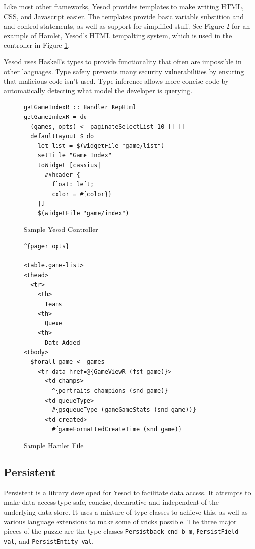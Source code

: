 \documentclass{chi2009}
\newcommand{\code}[1]{\texttt{#1}}
\begin{document}
Like most other frameworks, Yesod provides templates to make writing HTML, CSS, and Javascript easier. The templates provide basic variable substition and and control statements, as well as support for simplified stuff. See Figure \ref{hamlet} for an example of Hamlet, Yesod's HTML tempalting system, which is used in the controller in Figure \ref{controller}.

Yesod uses Haskell's types to provide functionality that often are impossible in other languages. Type safety prevents many security vulnerabilities by ensuring that malicious code isn't used. Type inference allows more concise code by automatically detecting what model the developer is querying.


\begin{figure}[]
\begin{verbatim}
getGameIndexR :: Handler RepHtml
getGameIndexR = do
  (games, opts) <- paginateSelectList 10 [] []
  defaultLayout $ do
    let list = $(widgetFile "game/list")
    setTitle "Game Index"
    toWidget [cassius|
      ##header {
        float: left;
        color = #{color}}
    |] 
    $(widgetFile "game/index")
\end{verbatim}
    \caption{Sample Yesod Controller}
    \label{controller}
\end{figure}

\begin{figure}[]
\begin{verbatim}
^{pager opts}

<table.game-list>
<thead>
  <tr>
    <th>
      Teams
    <th>
      Queue
    <th>
      Date Added
<tbody>
  $forall game <- games
    <tr data-href=@{GameViewR (fst game)}>
      <td.champs>
        ^{portraits champions (snd game)}
      <td.queueType>
        #{gsqueueType (gameGameStats (snd game))}
      <td.created>
        #{gameFormattedCreateTime (snd game)}
\end{verbatim}
    \caption{Sample Hamlet File}
    \label{hamlet}
\end{figure}

\subsection{Persistent}

Persistent is a library developed for Yesod to facilitate data access.  It attempts to make data access type safe, concise, declarative and independent of the underlying data store.  It uses a mixture of type-classes to achieve this, as well as various language extensions to make some of tricks possible.  The three major pieces of the puzzle are the type classes \code{Persistback-end b m}, \code{PersistField val}, and \code{PersistEntity val}.
\end{document}
